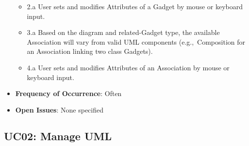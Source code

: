 \documentclass[12pt]{article}
\begin{document}
\begin{itemize}
\begin{itemize}
            \item 2.a User sets and modifies Attributes of a Gadget by mouse or keyboard input.
            \item 3.a Based on the diagram and related-Gadget type, the available Association will vary from valid UML components (e.g.,\ Composition for an Association linking two class Gadgets).
            \item 4.a User sets and modifies Attributes of an Association by mouse or keyboard input.
        \end{itemize}
        \item \textbf{Frequency of Occurrence}: Often
        \item \textbf{Open Issues}: None specified
    \end{itemize}

    \subsection{UC02: Manage UML}
\end{document}
